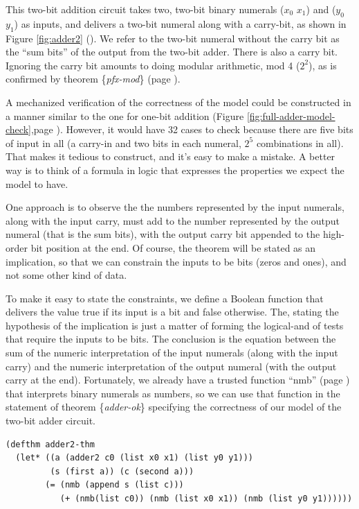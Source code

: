 This two-bit addition circuit takes two, two-bit binary numerals
($x_0$ $x_1$) and ($y_0$ $y_1$) as inputs, and
delivers a two-bit numeral along with a carry-bit,
as shown in Figure \ref{fig:adder2} (\pageref{fig:adder2}).
We refer to the two-bit numeral without the carry bit
as the ``sum bits'' of the output from the two-bit adder.
There is also a carry bit.
Ignoring the carry bit amounts to doing
modular arithmetic, mod 4 ($2^2$), as is
confirmed by theorem \{\emph{pfx-mod}\} (page \pageref{pfx-mod}).

A mechanized verification of the correctness of the model
could be constructed in a manner similar to the one for one-bit addition
(Figure \ref{fig:full-adder-model-check},page \pageref{fig:full-adder-model-check}).
However, it would have 32 cases to check
because there are five bits of input in all
(a carry-in and two bits in each numeral, $2^5$ combinations in all).
That makes it tedious to construct, and it's easy to make a mistake.
A better way is to think of a formula in logic that expresses
the properties we expect the model to have.

One approach is to observe
the the numbers represented by the input
numerals, along with the input carry, must
add to the number represented by the output numeral (that is the sum bits),
with the output carry bit appended to the high-order bit position at the end.
Of course, the theorem will be stated as an implication, so that
we can constrain the inputs to be bits (zeros and ones),
and not some other kind of data.

To make it easy to state the constraints,
we define a Boolean function that delivers the value true
if its input is a bit and false otherwise.
The, stating the hypothesis of the implication
is just a matter of forming the logical-and
of tests that require the inputs to be bits.
The conclusion is the equation between the
sum of the numeric interpretation of the input numerals
(along with the input carry)
and the numeric interpretation of the output numeral
(with the output carry at the end).
Fortunately, we already have a trusted function
``nmb'' (page \pageref{nmb-defun})
that interprets binary numerals as numbers,
so we can use that function in the statement of
theorem \{\emph{adder-ok}\} specifying
the correctness of our model of the two-bit adder circuit.

\begin{Verbatim}
(defthm adder2-thm
  (let* ((a (adder2 c0 (list x0 x1) (list y0 y1)))
         (s (first a)) (c (second a)))
        (= (nmb (append s (list c)))
           (+ (nmb(list c0)) (nmb (list x0 x1)) (nmb (list y0 y1))))))
\end{Verbatim}
\label{adder2-ok}

